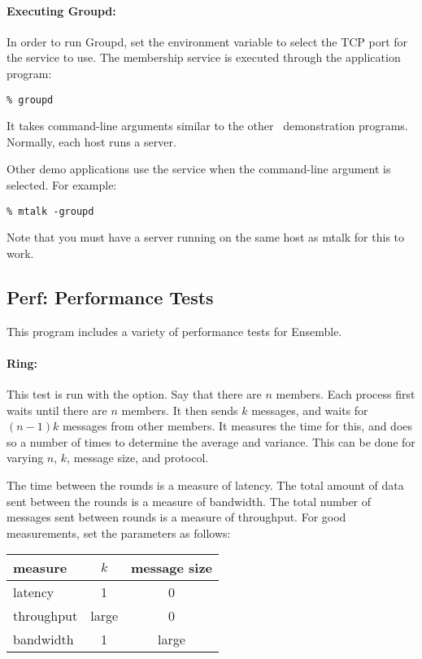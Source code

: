 \paragraph{Executing Groupd:}
In order to run Groupd, set the  environment
variable to select the TCP port for the service to use.  The
membership service is executed through the  application
program:
\begin{verbatim}
% groupd
\end{verbatim}
It takes command-line arguments similar to the other \ensemble\
demonstration programs.  Normally, each host runs a server.

Other demo applications use the service when the 
command-line argument is selected.  For example:
\begin{verbatim}
% mtalk -groupd
\end{verbatim}
Note that you must have a  server running on the same host as
mtalk for this to work.


\subsection{Perf: Performance Tests}
This program includes a variety of performance tests for Ensemble.

\paragraph{Ring:}
This test is run with the  option.  Say that there
are $n$ members.  Each process first waits until there are $n$
members.  It then sends $k$ messages, and waits for $(n - 1)k$
messages from other members.  It measures the time for this, and does
so a number of times to determine the average and variance.  This can
be done for varying $n$, $k$, message size, and protocol.

The time between the rounds is a measure of latency.  The total amount
of data sent between the rounds is a measure of bandwidth.  The total
number of messages sent between rounds is a measure of throughput.
For good measurements, set the parameters as follows:

\begin{center}
\begin{tabular}{|l|c|c|}			   \hline
measure		& $k$		& message size	\\ \hline \hline
latency		&  1		& 0		\\ \hline
throughput	& large		& 0		\\ \hline
bandwidth	&  1		& large		\\ \hline
\end{tabular}
\end{center}

